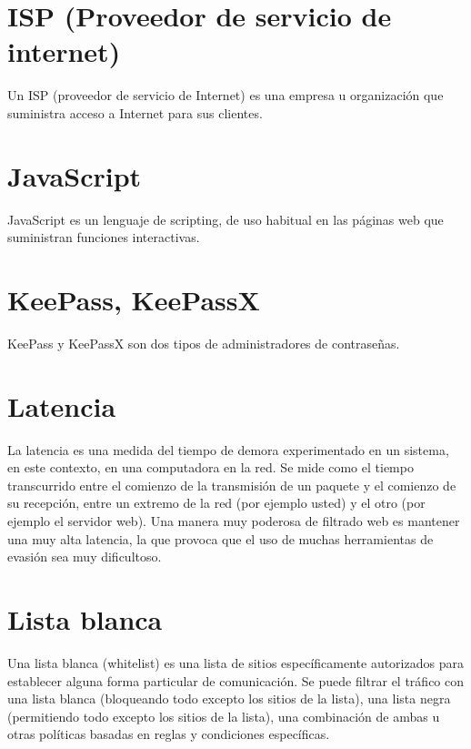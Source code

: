 \documentclass[10pt,a5paper,twoside,,]{book}
\begin{document}
\section{ISP (Proveedor de servicio de
internet)}\label{isp-proveedor-de-servicio-de-internet}

Un ISP (proveedor de servicio de Internet) es una empresa u organización
que suministra acceso a Internet para sus clientes.

\section{JavaScript}\label{javascript}

JavaScript es un lenguaje de scripting, de uso habitual en las páginas
web que suministran funciones interactivas.

\section{KeePass, KeePassX}\label{keepass-keepassx}

KeePass y KeePassX son dos tipos de administradores de contraseñas.

\section{Latencia}\label{latencia}

La latencia es una medida del tiempo de demora experimentado en un
sistema, en este contexto, en una computadora en la red. Se mide como el
tiempo transcurrido entre el comienzo de la transmisión de un paquete y
el comienzo de su recepción, entre un extremo de la red (por ejemplo
usted) y el otro (por ejemplo el servidor web). Una manera muy poderosa
de filtrado web es mantener una muy alta latencia, la que provoca que el
uso de muchas herramientas de evasión sea muy dificultoso.

\section{Lista blanca}\label{lista-blanca}

Una lista blanca (whitelist) es una lista de sitios específicamente
autorizados para establecer alguna forma particular de comunicación. Se
puede filtrar el tráfico con una lista blanca (bloqueando todo excepto
los sitios de la lista), una lista negra (permitiendo todo excepto los
sitios de la lista), una combinación de ambas u otras políticas basadas
en reglas y condiciones específicas.
\end{document}
